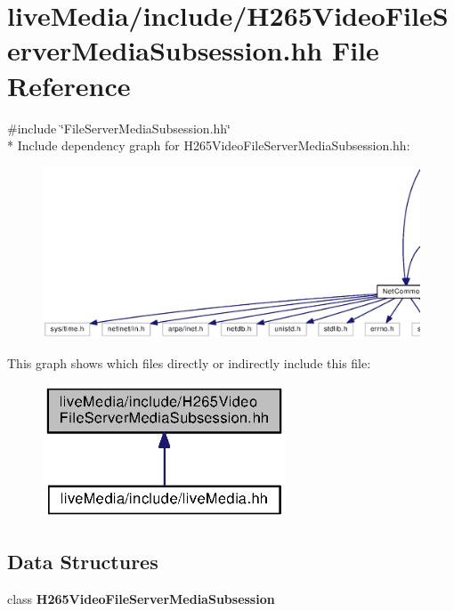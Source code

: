 \section{live\+Media/include/\+H265\+Video\+File\+Server\+Media\+Subsession.hh File Reference}
\label{H265VideoFileServerMediaSubsession_8hh}
{\ttfamily \#include \char`\"{}File\+Server\+Media\+Subsession.\+hh\char`\"{}}\\*
Include dependency graph for H265\+Video\+File\+Server\+Media\+Subsession.\+hh\+:
\nopagebreak
\begin{figure}[H]
\begin{center}
\leavevmode
\includegraphics[width=350pt]{H265VideoFileServerMediaSubsession_8hh__incl}
\end{center}
\end{figure}
This graph shows which files directly or indirectly include this file\+:
\nopagebreak
\begin{figure}[H]
\begin{center}
\leavevmode
\includegraphics[width=205pt]{H265VideoFileServerMediaSubsession_8hh__dep__incl}
\end{center}
\end{figure}
\subsection*{Data Structures}
\begin{DoxyCompactItemize}
\item 
class {\bf H265\+Video\+File\+Server\+Media\+Subsession}
\end{DoxyCompactItemize}
